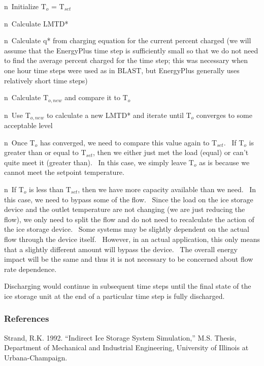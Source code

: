 n~Initialize T\(_{o}\) = T\(_{set}\)

n~Calculate LMTD*

n~Calculate q* from charging equation for the current percent charged (we will assume that the EnergyPlus time step is sufficiently small so that we do not need to find the average percent charged for the time step; this was necessary when one hour time steps were used as in BLAST, but EnergyPlus generally uses relatively short time steps)

n~Calculate T\(_{o,new}\) and compare it to T\(_{o}\)

n~Use T\(_{o,new}\) to calculate a new LMTD* and iterate until T\(_{o}\) converges to some acceptable level

n~Once T\(_{o}\) has converged, we need to compare this value again to T\(_{set}\).~ If T\(_{o}\) is greater than or equal to T\(_{set}\), then we either just met the load (equal) or can't quite meet it (greater than).~ In this case, we simply leave T\(_{o}\) as is because we cannot meet the setpoint temperature.

n~If T\(_{o}\) is less than T\(_{set}\), then we have more capacity available than we need.~ In this case, we need to bypass some of the flow.~ Since the load on the ice storage device and the outlet temperature are not changing (we are just reducing the flow), we only need to split the flow and do not need to recalculate the action of the ice storage device.~ Some systems may be slightly dependent on the actual flow through the device itself.~ However, in an actual application, this only means that a slightly different amount will bypass the device.~ The overall energy impact will be the same and thus it is not necessary to be concerned about flow rate dependence.

Discharging would continue in subsequent time steps until the final state of the ice storage unit at the end of a particular time step is fully discharged.

\subsubsection{References}\label{references-1-011}

Strand, R.K. 1992. ``Indirect Ice Storage System Simulation,'' M.S. Thesis, Department of Mechanical and Industrial Engineering, University of Illinois at Urbana-Champaign.
